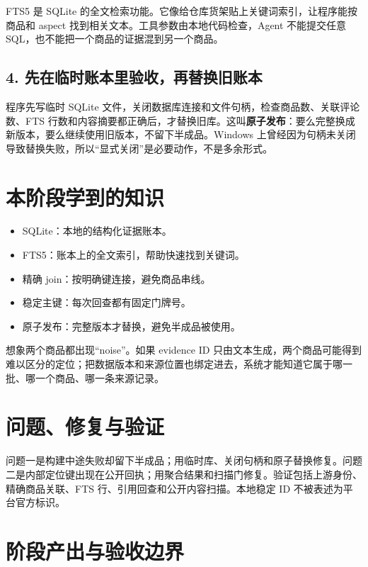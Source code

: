 FTS5 是 SQLite 的全文检索功能。它像给仓库货架贴上关键词索引，让程序能按商品和 aspect 找到相关文本。工具参数由本地代码检查，Agent 不能提交任意 SQL，也不能把一个商品的证据混到另一个商品。

\subsection{4. 先在临时账本里验收，再替换旧账本}

程序先写临时 SQLite 文件，关闭数据库连接和文件句柄，检查商品数、关联评论数、FTS 行数和内容摘要都正确后，才替换旧库。这叫\textbf{原子发布}：要么完整换成新版本，要么继续使用旧版本，不留下半成品。Windows 上曾经因为句柄未关闭导致替换失败，所以“显式关闭”是必要动作，不是多余形式。

\section{本阶段学到的知识}

\begin{itemize}
  \item SQLite：本地的结构化证据账本。
  \item FTS5：账本上的全文索引，帮助快速找到关键词。
  \item 精确 join：按明确键连接，避免商品串线。
  \item 稳定主键：每次回查都有固定门牌号。
  \item 原子发布：完整版本才替换，避免半成品被使用。
\end{itemize}

\begin{beginnerbox}
想象两个商品都出现“noise”。如果 evidence ID 只由文本生成，两个商品可能得到难以区分的定位；把数据版本和来源位置也绑定进去，系统才能知道它属于哪一批、哪一个商品、哪一条来源记录。
\end{beginnerbox}

\section{问题、修复与验证}

问题一是构建中途失败却留下半成品；用临时库、关闭句柄和原子替换修复。问题二是内部定位键出现在公开回执；用聚合结果和扫描门修复。验证包括上游身份、精确商品关联、FTS 行、引用回查和公开内容扫描。本地稳定 ID 不被表述为平台官方标识。

\section{阶段产出与验收边界}

